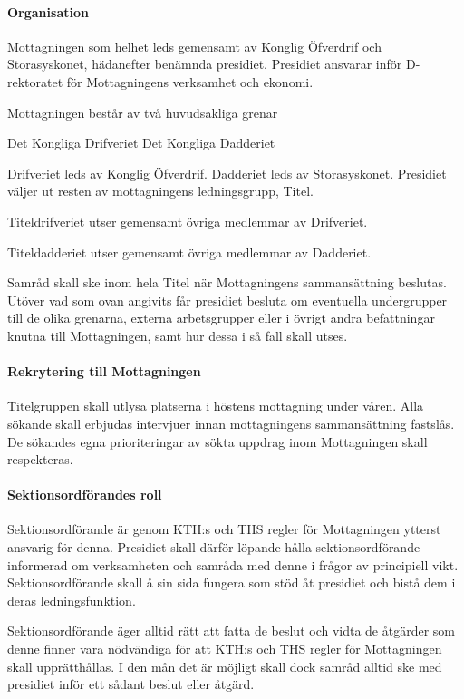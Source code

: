 \documentclass[a4paper,12pt]{article}
\begin{document}
\paragraph{Organisation}

Mottagningen som helhet leds gemensamt av Konglig Öfverdrif och Storasyskonet, hädanefter benämnda presidiet. Presidiet ansvarar inför D-rektoratet för Mottagningens verksamhet och ekonomi.

Mottagningen består av två huvudsakliga grenar

Det Kongliga Drifveriet
Det Kongliga Dadderiet

Drifveriet leds av Konglig Öfverdrif. Dadderiet leds av Storasyskonet. Presidiet väljer ut resten av mottagningens ledningsgrupp, Titel.

Titeldrifveriet utser gemensamt övriga medlemmar av Drifveriet.

Titeldadderiet utser gemensamt övriga medlemmar av Dadderiet.

Samråd skall ske inom hela Titel när Mottagningens sammansättning beslutas. Utöver vad som ovan angivits får presidiet besluta om eventuella undergrupper till de olika grenarna, externa arbetsgrupper eller i övrigt andra befattningar knutna till Mottagningen, samt hur dessa i så fall skall utses.

\paragraph{Rekrytering till Mottagningen}

Titelgruppen skall utlysa platserna i höstens mottagning under våren. Alla sökande skall erbjudas intervjuer innan mottagningens sammansättning fastslås. De sökandes egna prioriteringar av sökta uppdrag inom Mottagningen skall respekteras.

\paragraph{Sektionsordförandes roll}

Sektionsordförande är genom KTH:s och THS regler för Mottagningen ytterst ansvarig för denna. Presidiet skall därför löpande hålla sektionsordförande informerad om verksamheten och samråda med denne i frågor av principiell vikt. Sektionsordförande skall å sin sida fungera som stöd åt presidiet och bistå dem i deras ledningsfunktion.

Sektionsordförande äger alltid rätt att fatta de beslut och vidta de åtgärder som denne finner vara nödvändiga för att KTH:s och THS regler för Mottagningen skall upprätthållas. I den mån det är möjligt skall dock samråd alltid ske med presidiet inför ett sådant beslut eller åtgärd.
\end{document}
